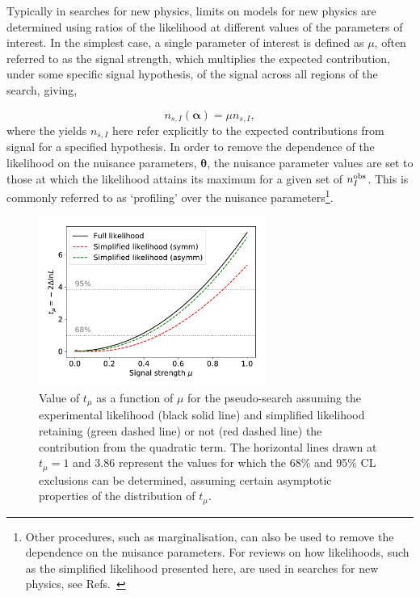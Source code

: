 \documentclass[11pt]{article}
\begin{document}
Typically in searches for new physics, limits on models for new physics
are determined using ratios of the likelihood at different values of the parameters of interest.
In the simplest case, a single parameter of interest is defined as $\mu$, often referred to
as the signal strength, which multiplies the expected contribution, under some specific signal hypothesis,
of the signal across all regions of the search, giving,

\begin{equation}
 n_{s,I}(\bm{\alpha}) = \mu n_{s,I},
\label{eq:muscale}
\end{equation}
where the yields $n_{s,I}$ here refer explicitly to the expected contributions from signal for a specified hypothesis.
In order to remove the dependence of the likelihood on the nuisance parameters, $\bm{\theta}$, the nuisance parameter values are set to those at which
the likelihood attains its maximum for a given set of $n^{\rm{obs}}_{I}$. This is 
commonly referred to as `profiling' over the nuisance parameters\footnote{Other 
procedures, such as marginalisation, can also be used to remove the dependence on 
the nuisance parameters. For 
reviews on how likelihoods, such as the simplified likelihood presented here, are
used in searches for new physics, see Refs.~\cite{CowanPDGProb,0954-3899-45-3-033001}}. 

\begin{figure}[t!]
  \centering
  \includegraphics[width=0.66\textwidth]{figures/testtoy-tmuscan}
  \caption{Value of $t_{\mu}$ as a function of $\mu$ for the pseudo-search assuming the experimental likelihood (black solid line) and simplified likelihood retaining (green dashed line) or not (red dashed line) the contribution from the quadratic term. The horizontal lines drawn at $t_{\mu}=1$ and $3.86$ represent the
  values for which the 68\% and 95\% CL exclusions can be determined, assuming certain asymptotic properties of the distribution of $t_{\mu}$.}
  \label{fig:tmucompare}
\end{figure}
\end{document}
